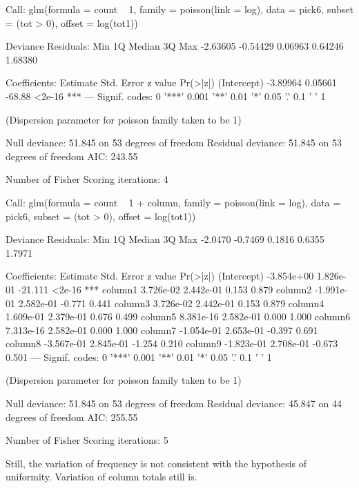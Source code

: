 \documentclass{article}
\begin{document}
\begin{Schunk}
\begin{Soutput}
Call:
glm(formula = count ~ 1, family = poisson(link = log), data = pick6, 
    subset = (tot > 0), offset = log(tot1))

Deviance Residuals: 
     Min        1Q    Median        3Q       Max  
-2.63605  -0.54429   0.06963   0.64246   1.68380  

Coefficients:
            Estimate Std. Error z value Pr(>|z|)    
(Intercept) -3.89964    0.05661  -68.88   <2e-16 ***
---
Signif. codes:  0 '***' 0.001 '**' 0.01 '*' 0.05 '.' 0.1 ' ' 1

(Dispersion parameter for poisson family taken to be 1)

    Null deviance: 51.845  on 53  degrees of freedom
Residual deviance: 51.845  on 53  degrees of freedom
AIC: 243.55

Number of Fisher Scoring iterations: 4
\end{Soutput}
\begin{Soutput}
Call:
glm(formula = count ~ 1 + column, family = poisson(link = log), 
    data = pick6, subset = (tot > 0), offset = log(tot1))

Deviance Residuals: 
    Min       1Q   Median       3Q      Max  
-2.0470  -0.7469   0.1816   0.6355   1.7971  

Coefficients:
              Estimate Std. Error z value Pr(>|z|)    
(Intercept) -3.854e+00  1.826e-01 -21.111   <2e-16 ***
column1      3.726e-02  2.442e-01   0.153    0.879    
column2     -1.991e-01  2.582e-01  -0.771    0.441    
column3      3.726e-02  2.442e-01   0.153    0.879    
column4      1.609e-01  2.379e-01   0.676    0.499    
column5      8.381e-16  2.582e-01   0.000    1.000    
column6      7.313e-16  2.582e-01   0.000    1.000    
column7     -1.054e-01  2.653e-01  -0.397    0.691    
column8     -3.567e-01  2.845e-01  -1.254    0.210    
column9     -1.823e-01  2.708e-01  -0.673    0.501    
---
Signif. codes:  0 '***' 0.001 '**' 0.01 '*' 0.05 '.' 0.1 ' ' 1

(Dispersion parameter for poisson family taken to be 1)

    Null deviance: 51.845  on 53  degrees of freedom
Residual deviance: 45.847  on 44  degrees of freedom
AIC: 255.55

Number of Fisher Scoring iterations: 5
\end{Soutput}
\end{Schunk}
Still, the variation of frequency is not consistent with the hypothesis of uniformity. Variation of column totals still is.
\end{document}
